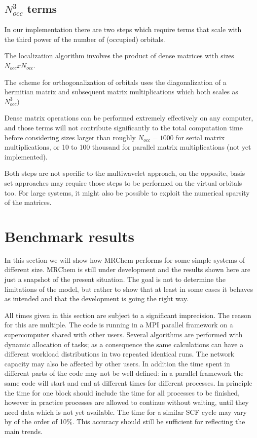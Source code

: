 \documentclass{article}
\begin{document}
\subsection{$N_{occ}^3$ terms}

In our implementation there are two steps which require terms that scale with the third power of the number of (occupied) orbitals. 

The localization algorithm involves the product of dense matrices with sizes $N_{occ} x N_{occ}$. 

The scheme for orthogonalization of orbitals uses the diagonalization of a hermitian matrix and subsequent matrix multiplications which both scales as $N_{occ}^3)$

Dense matrix operations can be performed extremely effectively on any computer, and those terms will not contribute significantly to the total computation time before considering sizes larger than roughly $N_{occ}=1000$ for serial matrix multiplications, or 10 to 100 thousand for parallel matrix multiplications (not yet implemented). 

Both steps are not specific to the multiwavelet approach, on the opposite, basis set approaches may require those steps to be performed on the virtual orbitals too. For large systems, it might also be possible to exploit the numerical sparsity of the matrices.


\section{Benchmark results}

In this section we will show how MRChem performs for some simple systems of different size. MRChem is still under development and the results shown here are just a snapshot of the present situation. The goal is not to determine the limitations of the model, but rather to show that at least in some cases it behaves as intended and that the development is going the right way.

All times given in this section are subject to a significant imprecision. The reason for this are multiple. The code is running in a MPI parallel framework on a supercomputer shared with other users. Several algorithms are performed with dynamic allocation of tasks; as a consequence the same calculations can have a different workload distributions in two repeated identical runs. The network capacity may also be affected by other users. In addition the time spent in different parts of the code may not be well defined: in a parallel framework the same code will start and end at different times for different processes. In principle the time for one block should include the time for all processes to be finished, however in practice processes are allowed to continue without waiting, until they need data which is not yet available.
The time for a similar SCF cycle may vary by of the order of 10\%. This accuracy should still be sufficient for reflecting the main trends. 
\end{document}
